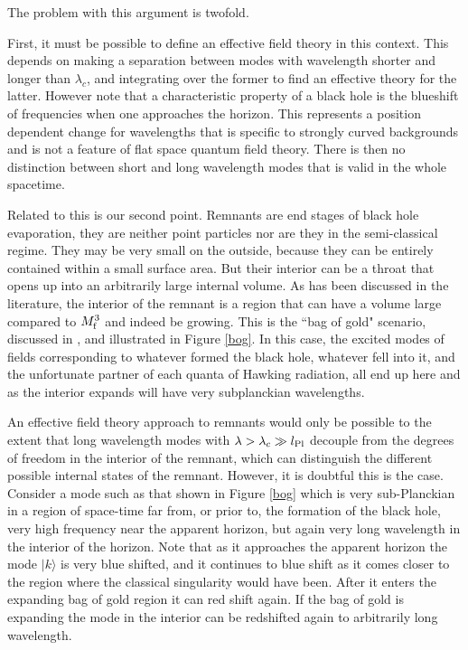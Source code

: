 \documentclass[12pt]{article}
\begin{document}
The problem with this argument is twofold. 

First, it must be possible to define an effective field theory in this context.  This depends on making a separation between modes with
wavelength shorter and longer than $\lambda_c$, and integrating over the former to find an effective theory for the latter.  However note that a characteristic property of a black hole is the blueshift of frequencies when one approaches the horizon. This represents a
position dependent change for wavelengths that is specific to strongly curved backgrounds and is not a feature
of flat space quantum field theory. There is then no distinction between short and long wavelength modes that is valid in the whole spacetime.  

Related to this is our second point. Remnants are end stages of black hole evaporation, they are neither point particles nor are they in the semi-classical regime. They may be
very small on the outside, because they can be entirely contained within a small surface area. But their interior can be a throat that opens up into an arbitrarily large internal volume. As has been discussed in the literature, the interior of the remnant 
is a region that can have a volume large compared to $M_{\rm f}^3$ and indeed be growing. This is the ``bag of gold" scenario, discussed in \cite{bog}, and illustrated in Figure \ref{bog}. In this case, the excited modes of fields corresponding to whatever formed the black hole, whatever fell into it, and the unfortunate partner of each quanta of Hawking radiation, all end up here and as the interior expands will have very subplanckian wavelengths. 

An effective field theory approach to remnants would only be possible to the extent that 
 long wavelength modes with 
$\lambda > \lambda_c \gg l_{{\rm Pl}}$ decouple from the degrees of freedom in the interior of the remnant, which can distinguish the different possible internal states of the remnant.  However, it is doubtful this  is the case. Consider a mode such as that shown in Figure \ref{bog} which is very sub-Planckian in a region of space-time far from, or prior to,  the formation of the black hole, very high frequency near the apparent horizon, but again very long wavelength in the interior of the horizon.  Note that as it approaches the apparent horizon the mode $|k \rangle$ is very blue shifted, and it continues to blue shift as it comes closer to the region where the classical singularity would have been.  After it enters the expanding bag of gold region it can red shift again. If the bag of gold is expanding the mode in the interior can be redshifted again to arbitrarily long wavelength.
\end{document}

